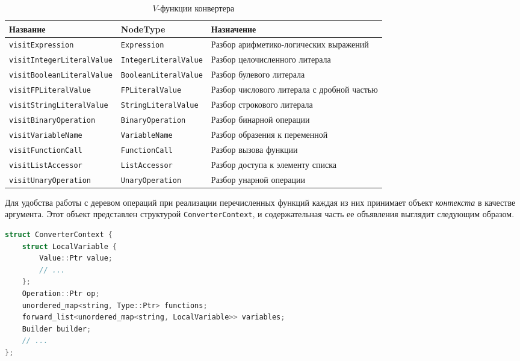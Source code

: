 \begin{table}[h]
    \centering
    \caption{\(V\)-функции конвертера}
    \label{tab:converter_visit_node}
    \begin{tabular}{lp{4cm}p{6cm}}
        \toprule
        \textbf{Название}               & \textbf{NodeType\footnotemark[2]} & \textbf{Назначение}                        \\
        \midrule
        \verb|visitExpression|          & \verb|Expression|                 & Разбор арифметико-логических выражений     \\
        \verb|visitIntegerLiteralValue| & \verb|IntegerLiteralValue|        & Разбор целочисленного литерала             \\
        \verb|visitBooleanLiteralValue| & \verb|BooleanLiteralValue|        & Разбор булевого литерала                   \\
        \verb|visitFPLiteralValue|      & \verb|FPLiteralValue|             & Разбор числового литерала с дробной частью \\
        \verb|visitStringLiteralValue|  & \verb|StringLiteralValue|         & Разбор строкового литерала                 \\
        \verb|visitBinaryOperation|     & \verb|BinaryOperation|            & Разбор бинарной операции                   \\
        \verb|visitVariableName|        & \verb|VariableName|               & Разбор образения к переменной              \\
        \verb|visitFunctionCall|        & \verb|FunctionCall|               & Разбор вызова функции                      \\
        \verb|visitListAccessor|        & \verb|ListAccessor|               & Разбор доступа к элементу списка           \\
        \verb|visitUnaryOperation|      & \verb|UnaryOperation|             & Разбор унарной операции                    \\
        \bottomrule
    \end{tabular}
\end{table}

Для удобства работы с деревом операций при реализации перечисленных функций каждая из них принимает объект \textit{контекста} в качестве аргумента.
Этот объект представлен структурой \verb|ConverterContext|, и содержательная часть ее объявления выглядит следующим образом.

\begin{lstlisting}[language=C++, caption=Объявление структуры ConverterContext]
struct ConverterContext {
    struct LocalVariable {
        Value::Ptr value;
        // ...
    };
    Operation::Ptr op;
    unordered_map<string, Type::Ptr> functions;
    forward_list<unordered_map<string, LocalVariable>> variables;
    Builder builder;
    // ...
};
\end{lstlisting}

